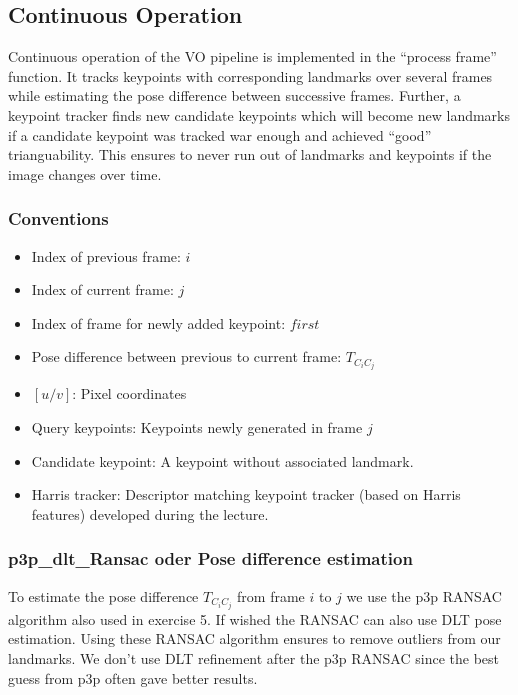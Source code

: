 \subsection{Continuous Operation}
\label{sec_cont_op}
Continuous operation of the VO pipeline is implemented in the ``process frame'' function. It tracks keypoints with corresponding landmarks over several frames while estimating the pose difference between successive frames. Further, a keypoint tracker finds new candidate keypoints which will become new landmarks if a candidate keypoint was tracked war enough and achieved ``good'' trianguability. This ensures to never run out of landmarks and keypoints if the image changes over time.

\subsubsection{Conventions}
\begin{itemize}
	\item Index of previous frame: $i$
	\item Index of current frame: $j$
	\item Index of frame for newly added keypoint: $first$
	\item Pose difference between previous to current frame: $T_{C_iC_j}$
	\item $\left[u/v\right]$: Pixel coordinates
	\item Query keypoints: Keypoints newly generated in frame $j$ 
	\item Candidate keypoint: A keypoint without associated landmark.
	\item Harris tracker: Descriptor matching keypoint tracker (based on Harris features) developed during the lecture.
\end{itemize}

\subsubsection{p3p\_dlt\_Ransac oder Pose difference estimation} \label{ransac_cont}
To estimate the pose difference $T_{C_iC_j}$ from frame $i$ to $j$ we use the p3p RANSAC algorithm also used in exercise 5. If wished the RANSAC can also use DLT pose estimation. Using these RANSAC algorithm ensures to remove outliers from our landmarks. We don't use DLT refinement after the p3p RANSAC since the best guess from p3p often gave better results.

